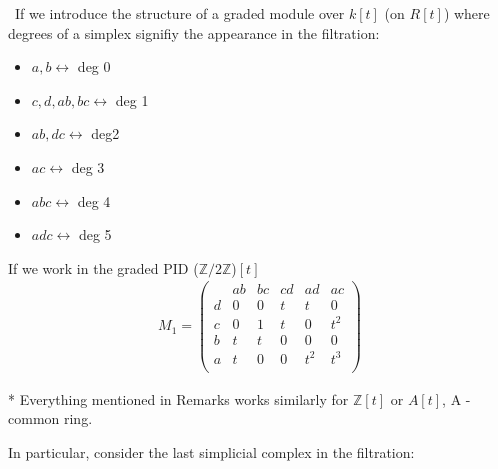 \documentclass[11pt,a4paper]{report}
\begin{document}
              \
              If we introduce the structure of a graded module over $k[t]$ (on $R[t]$) where degrees of a simplex signifiy the appearance in the filtration:\\
              \begin{itemize}
              \item $a,b \longleftrightarrow$ deg 0
              \item $c,d,ab,bc \longleftrightarrow$ deg 1
              \item $ab, dc \longleftrightarrow$ deg2
              \item $ac \longleftrightarrow$ deg 3
              \item $abc \longleftrightarrow$ deg 4
              \item $adc \longleftrightarrow$ deg 5
              \end{itemize}
              If we work in the graded PID ($\mathbb{Z}/2\mathbb{Z}$)$[t]$\\
              \begin{align*}
                M_1 = \left(\begin{array}{c|ccccc}
                        &ab&bc&cd&ad&ac\\\hline
                        d&0&0&t&t&0\\
                        c&0&1&t&0&t^2\\
                        b&t&t&0&0&0\\
                        a&t&0&0&t^2&t^3\\
                      \end{array}\right)
              \end{align*}
              
              
              * Everything mentioned in Remarks works similarly for $\mathbb{Z}[t]$ or $A[t]$, A - common ring. 
              
              In particular, consider the last simplicial complex in the filtration:
\end{document}
